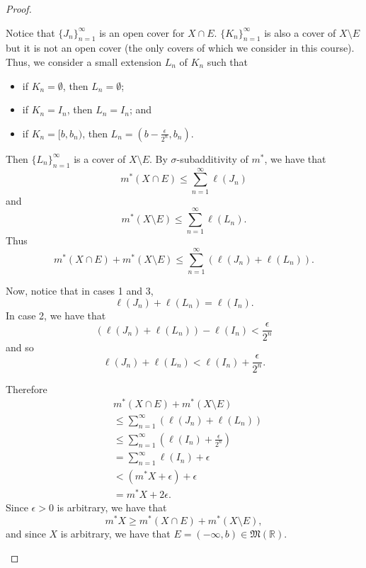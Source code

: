 \documentclass[notoc,notitlepage]{tufte-book}
\begin{document}
\begin{proof}
\begin{enumerate}
      Notice that $\{ J_n \}_{n=1}^{\infty}$ is an open cover for $X \cap E$.
      $\{ K_n \}_{n=1}^{\infty}$ is also a cover of $X \setminus E$ but it is
      not an open cover (the only covers of which we consider in this course).
      Thus, we consider a small extension $L_n$ of $K_n$ such that
      \begin{itemize}
        \item if $K_n = \emptyset$, then $L_n = \emptyset$;
        \item if $K_n = I_n$, then $L_n = I_n$; and
        \item if $K_n = [b, b_n)$, then $L_n = \left( b - \frac{\epsilon}{2^n},
          b_n \right)$.
      \end{itemize}
      Then $\{ L_n \}_{n=1}^{\infty}$ is a cover of $X \setminus E$. By
      $\sigma$-subadditivity of $m^*$, we have that
      \begin{equation*}
        m^* ( X \cap E ) \leq \sum_{n=1}^{\infty} \ell(J_n)
      \end{equation*}
      and
      \begin{equation*}
        m^* ( X \setminus E ) \leq \sum_{n=1}^{\infty} \ell(L_n).
      \end{equation*}
      Thus
      \begin{equation*}
        m^* (X \cap E) + m^* (X \setminus E) \leq \sum_{n=1}^{\infty} \left(
        \ell(J_n) + \ell(L_n) \right).
      \end{equation*}

      Now, notice that in cases 1 and 3,
      \begin{equation*}
        \ell(J_n) + \ell(L_n) = \ell(I_n).
      \end{equation*}
      In case 2, we have that
      \begin{equation*}
        (\ell(J_n) + \ell(L_n)) - \ell(I_n) < \frac{\epsilon}{2^n}
      \end{equation*}
      and so
      \begin{equation*}
        \ell(J_n) + \ell(L_n) < \ell(I_n) + \frac{\epsilon}{2^n}.
      \end{equation*}

      Therefore
      \begin{align*}
        &m^* (X \cap E) + m^* (X \setminus E) \\
        &\leq \sum_{n=1}^{\infty} \left( \ell(J_n) + \ell(L_n) \right) \\
        &\leq \sum_{n=1}^{\infty} \left(\ell(I_n) + \frac{\epsilon}{2^n}\right) \\
        &= \sum_{n=1}^{\infty} \ell(I_n) + \epsilon \\
        &< \left( m^* X + \epsilon \right) + \epsilon \\
        &= m^* X + 2 \epsilon.
      \end{align*}
      Since $\epsilon > 0$ is arbitrary, we have that
      \begin{equation*}
        m^* X \geq m^* (X \cap E) + m^* ( X \setminus E ),
      \end{equation*}
      and since $X$ is arbitrary, we have that $E = (-\infty, b) \in
      \mathfrak{M}(\mathbb{R})$.


\end{enumerate}
\end{proof}
\end{document}
